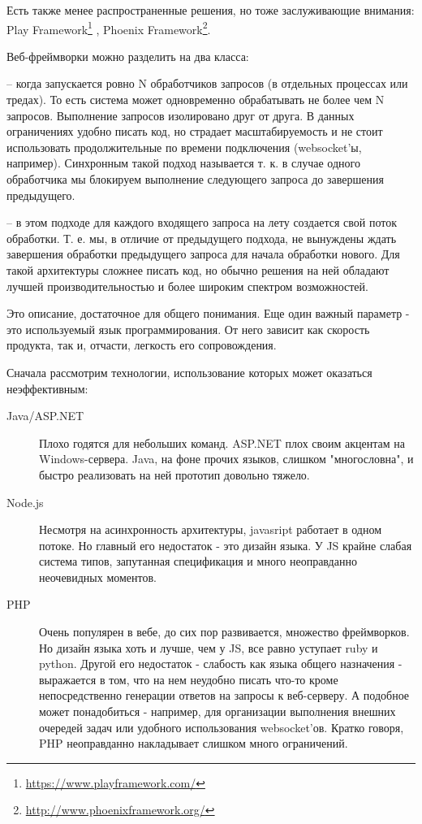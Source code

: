 Есть также менее распространенные решения, но тоже заслуживающие внимания: Play Framework\footnote{\url{https://www.playframework.com/}} , Phoenix Framework\footnote{\url{http://www.phoenixframework.org/}}.

Веб-фреймворки можно разделить на два класса:

\begin{description}
  \item[С "синхронной" архитектурой] -- когда запускается ровно N обработчиков запросов (в отдельных процессах или тредах). То есть система может одновременно обрабатывать не более чем N запросов. Выполнение запросов изолировано друг от друга. В данных ограничениях удобно писать код, но страдает масштабируемость и не стоит использовать продолжительные по времени подключения (websocket'ы, например). Синхронным такой подход называется т. к. в случае одного обработчика мы блокируем выполнение следующего запроса до завершения предыдущего.
  \item[С "асинхронной" архитектурой] -- в этом подходе для каждого входящего запроса на лету создается свой поток обработки. Т. е. мы, в отличие от предыдущего подхода, не вынуждены ждать завершения обработки предыдущего запроса для начала обработки нового. Для такой архитектуры сложнее писать код, но обычно решения на ней обладают лучшей производительностью и более широким спектром возможностей.
  \item
\end{description}

Это описание, достаточное для общего понимания. Еще один важный параметр - это используемый язык программирования. От него зависит как скорость продукта, так и, отчасти, легкость его сопровождения.

Сначала рассмотрим технологии, использование которых может оказаться неэффективным:

\begin{description}
	\item[Java/ASP.NET] Плохо годятся для небольших команд. ASP.NET плох своим акцентам на Windows-сервера. Java, на фоне прочих языков, слишком "многословна", и быстро реализовать на ней прототип довольно тяжело.
	\item[Node.js] Несмотря на асинхронность архитектуры, javasript работает в одном потоке. Но главный его недостаток - это дизайн языка. У JS крайне слабая система типов, запутанная спецификация и много неоправданно неочевидных моментов.
	\item[PHP] Очень популярен в вебе, до сих пор развивается, множество фреймворков. Но дизайн языка хоть и лучше, чем у JS, все равно уступает ruby и python. Другой его недостаток - слабость как языка общего назначения - выражается в том, что на нем неудобно писать что-то кроме непосредственно генерации ответов на запросы к веб-серверу. А подобное может понадобиться - например, для организации выполнения внешних очередей задач или удобного использования websocket'ов. Кратко говоря, PHP неоправданно накладывает слишком много ограничений.
\end{description}

